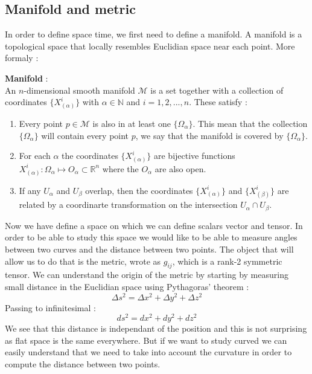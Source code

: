 \documentclass[a4paper,12pt]{article}
\theoremstyle{definition}
\begin{document}
\subsection{Manifold and metric}
In order to define space time, we first need to define a manifold.
A manifold is a topological space that locally resembles Euclidian space near each point.
More formaly :
\begin{definition}
	\textbf{Manifold} :\\
	An $n$-dimensional smooth manifold $\mathcal{M}$ is a set together with a collection of coordinates $\{ X^i_{(\alpha)}\}$
	with $\alpha \in \mathbb{N}$ and $i=1,2,...,n$. These satisfy :
	\begin{enumerate}
		\item Every point $p\in\mathcal{M}$ is also in at least one $\{\Omega_\alpha\}$.
		This mean that the collection $\{\Omega_\alpha\}$ will contain every point $p$,
		we say that the manifold is covered by $\{\Omega_\alpha\}$.
		\item For each $\alpha$ the coordinates $\{ X^i_{(\alpha)}\}$ are bijective functions $X^i_{(\alpha)}:\Omega_\alpha \mapsto O_\alpha \subset \mathbb{R}^n$
		where the $O_\alpha$ are also open.
		\item If any $U_\alpha$ and $U_\beta$ overlap, then the coordinates $\{ X^i_{(\alpha)}\}$ and $\{ X^i_{(\beta)}\}$
		are related by a coordinarte transformation on the intersection $U_\alpha \cap U_\beta$.
	\end{enumerate}
\end{definition}
Now we have define a space on which we can define scalars vector and tensor.
In order to be able to study this space we would like to be able to measure angles between two curves and the distance between two points.
The object that will allow us to do that is the metric, wrote as $g_{ij}$, which is a rank-2 symmetric tensor.
We can understand the origin of the metric by starting by measuring small distance in the Euclidian space using Pythagoras' theorem :
\begin{equation}
	\Delta s^2= \Delta x^2 + \Delta y^2 + \Delta z^2
\end{equation}
Passing to infinitesimal :
\begin{equation}\label{dist}
	ds^2= dx^2 + dy^2 + dz^2
\end{equation}
We see that this distance is independant of the position and this is not surprising as flat space is the same everywhere.
But if we want to study curved we can easily understand that we need to take into account the curvature in order to compute the distance between two points.\\
\end{document}
